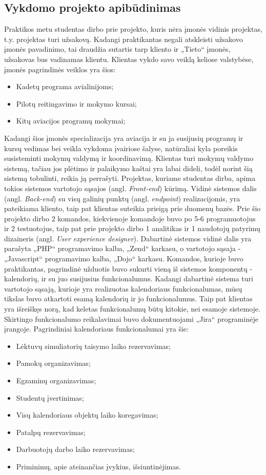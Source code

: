 \documentclass{VUMIFPSbakalaurinis}
\begin{document}
\subsection{Vykdomo projekto apibūdinimas}
Praktikos metu studentas dirbo prie projekto, kuris nėra įmonės vidinis projektas, t.y. projektas turi užsakovą. Kadangi praktikantas negali atskleisti užsakovo įmonės pavadinimo, tai draudžia sutartis tarp kliento ir „Tieto“ įmonės, užsakovas bus vadinamas klientu. Klientas vykdo savo veiklą keliose valstybėse, įmonės pagrindinės veiklos yra šios:
\begin{itemize}
    \item Kadetų programa avialinijoms;
    \item Pilotų reitingavimo ir mokymo kursai;
    \item Kitų aviacijos programų mokymai;
\end{itemize}
Kadangi šios įmonės specializacija yra aviacija ir su ja susijusių programų ir kursų vedimas bei veikla vykdoma įvairiose šalyse, natūraliai kyla poreikis susisteminti mokymų valdymą ir koordinavimą. Klientas turi mokymų valdymo sistemą, tačiau jos plėtimo ir palaikymo kaštai yra labai dideli, todėl norint šią sistemą tobulinti, reikia ją perrašyti. Projektas, kuriame studentas dirba, apima tokios sistemos vartotojo sąsajos (angl. \textit{Front-end}) kūrimą. Vidinė sistemos dalis (angl. \textit{Back-end}) su visų galinių punktų (angl. \textit{endpoint}) realizacijomis, yra pateikiama kliento, taip pat klientas suteikia prieigą prie duomenų bazės. Prie šio projekto dirbo 2 komandos, kiekvienoje komandoje buvo po 5-6 programuotojus ir 2 testuotojus, taip pat prie projekto dirbo 1 analitikas ir 1 naudotojų patyrimų dizaineris (angl. \textit{User experience designer}). Dabartinė sistemos vidinė dalis yra parašyta „PHP“ programavimo kalba, „Zend“ karkasu, o vartotojo sąsaja - „Javascript“ programavimo kalba, „Dojo“ karkasu. Komandos, kurioje buvo praktikantas, pagrindinė užduotis buvo sukurti vieną iš sistemos komponentų - kalendorių, ir su juo susijusius funkcionalumus. Kadangi dabartinė sistema turi vartotojo sąsają, kurioje yra realizuotas kalendoriaus funkcionalumas, mūsų tikslas buvo atkartoti esamą kalendorių ir jo funkcionalumus. Taip pat klientas yra išreiškęs norą, kad keletas funkcionalumų būtų kitokie, nei esamoje sistemoje. Skirtingo funkcionalumo reikalavimai buvo dokumentuojami „Jira“ programinėje įrangoje. Pagrindiniai kalendoriaus funkcionalumai yra šie:
\begin{itemize}
    \item Lėktuvų simuliatorių taisymo laiko rezervavimas;
    \item Pamokų organizavimas;
    \item Egzaminų organizavimas;
    \item Studentų įvertinimas;
    \item Visų kalendoriaus objektų laiko koregavimas;
    \item Patalpų rezervavimas;
    \item Darbuotojų darbo laiko rezervavimas;
    \item Priminimų, apie ateinančias įvykius, išsiuntinėjimas.
\end{itemize}
\end{document}
